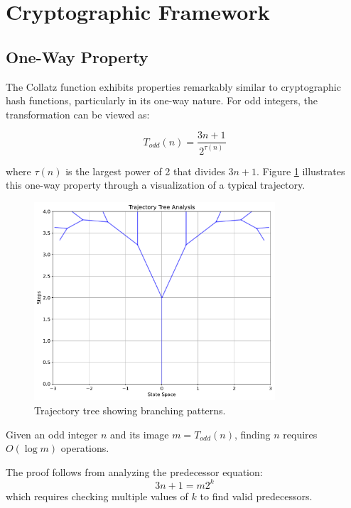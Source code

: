 \section{Cryptographic Framework}\label{sec:crypto_framework}

\subsection{One-Way Property}

The Collatz function exhibits properties remarkably similar to cryptographic hash functions, particularly in its one-way nature. For odd integers, the transformation can be viewed as:

\[
T_{odd}(n) = \frac{3n + 1}{2^{\tau(n)}}
\]

where $\tau(n)$ is the largest power of 2 that divides $3n + 1$. Figure \ref{fig:trajectory_tree} illustrates this one-way property through a visualization of a typical trajectory.

\begin{figure}[h]
\centering
\includegraphics[width=0.8\textwidth]{figures/trajectory_tree.pdf}
\caption{Trajectory tree showing branching patterns.}
\label{fig:trajectory_tree}
\end{figure}

\begin{theorem}\label{thm:one_way}
Given an odd integer $n$ and its image $m = T_{odd}(n)$, finding $n$ requires $O(\log m)$ operations.
\end{theorem}

The proof follows from analyzing the predecessor equation:
\[
3n + 1 = m2^k
\]
which requires checking multiple values of $k$ to find valid predecessors.

